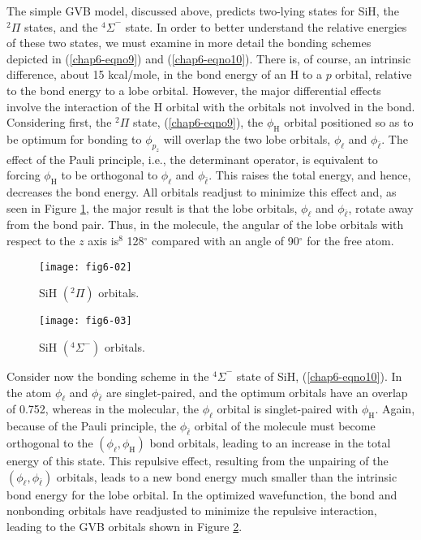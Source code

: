 The simple GVB model, discussed above, predicts
two-lying states for SiH, the ${^2\Pi}$ states, and the ${^4\Sigma}^-$
state.  In order to better understand the relative energies of these
two states, we must examine in more detail the bonding schemes
depicted in (\ref{chap6-eqno9}) and (\ref{chap6-eqno10}).  There is,
of course, an intrinsic difference, about 15 kcal/mole, in the bond
energy of an H to a $p$ orbital, relative to the bond energy to a lobe
orbital.  However, the major differential effects involve the
interaction of the H orbital with the orbitals not involved in the
bond.  Considering first, the ${^2\Pi}$ state, (\ref{chap6-eqno9}),
the $\phi_\mathrm{H}$ orbital positioned so as to be optimum for bonding to
$\phi_{p_z}$ will overlap the two lobe orbitals, $\phi_{\ell}$ and
$\phi_{\bar{\ell}}$.  The effect of the Pauli principle, i.e., the
determinant operator, is equivalent to forcing $\phi_\mathrm{H}$ to be
orthogonal to $\phi_{\ell}$ and $\phi_{\bar{\ell}}$.  This raises the
total energy, and hence, decreases the bond energy.  All orbitals
readjust to minimize this effect and, as seen in Figure
\ref{chap6-fig2}, the major result is that the lobe orbitals,
$\phi_{\ell}$ and $\phi_{\bar{\ell}}$, rotate away from the bond pair.
Thus, in the molecule, the angular of the lobe orbitals with respect
to the $z$ axis is$^8$ 128$^{\circ}$ compared with an angle of
90$^{\circ}$ for the free atom.

\begin{figure}
\texttt{[image: fig6-02]}
\caption{SiH $(^2\Pi)$ orbitals.}
\label{chap6-fig2}
\end{figure}

\begin{figure}
\texttt{[image: fig6-03]}
\caption{SiH $(^4\Sigma^-)$ orbitals.}
\label{chap6-fig3}
\end{figure}

Consider now the bonding scheme in the ${^4\Sigma}^-$ state of SiH,
(\ref{chap6-eqno10}).  In the atom $\phi_{\ell}$ and
$\phi_{\bar{\ell}}$ are singlet-paired, and the optimum orbitals have
an overlap of 0.752, whereas in the molecular, the $\phi_{\ell}$
orbital is singlet-paired with $\phi_\mathrm{H}$.  Again, because of the Pauli
principle, the $\phi_{\bar{\ell}}$ orbital of the molecule must become
orthogonal to the $(\phi_{\ell} , \phi_\mathrm{H})$ bond orbitals, leading to
an increase in the total energy of this state.  This repulsive effect,
resulting from the unpairing of the $(\phi_{\ell} ,
\phi_{\bar{\ell}})$ orbitals, leads to a new bond energy much smaller
than the intrinsic bond energy for the lobe orbital.  In the optimized
wavefunction, the bond and nonbonding orbitals have readjusted to
minimize the repulsive interaction, leading to the GVB
orbitals shown in Figure \ref{chap6-fig3}.

